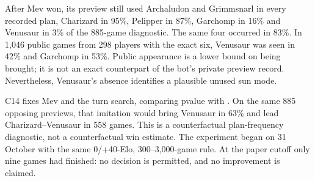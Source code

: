 After Mev won, its preview still used Archaludon and Grimmsnarl in every
recorded plan, Charizard in 95\%, Pelipper in 87\%, Garchomp in 16\% and
Venusaur in 3\% of the 885-game diagnostic. The same four occurred in 83\%.
In 1,046 public games from 298 players with the exact six, Venusaur was seen
in 42\% and Garchomp in 53\%. Public appearance is a lower bound on being
brought; it is not an exact counterpart of the bot's private preview record.
Nevertheless, Venusaur's absence identifies a plausible unused sun mode.

C14 fixes Mev and the turn search, comparing pvalue with
. On the same 885 opposing previews,
that imitation would bring Venusaur in 63\% and lead Charizard--Venusaur in
558 games. This is a counterfactual plan-frequency diagnostic, not a
counterfactual win estimate. The experiment began on 31 October with the
same 0/+40-Elo, 300--3,000-game rule. At the paper cutoff only nine games
had finished: no decision is permitted, and no improvement is claimed.

